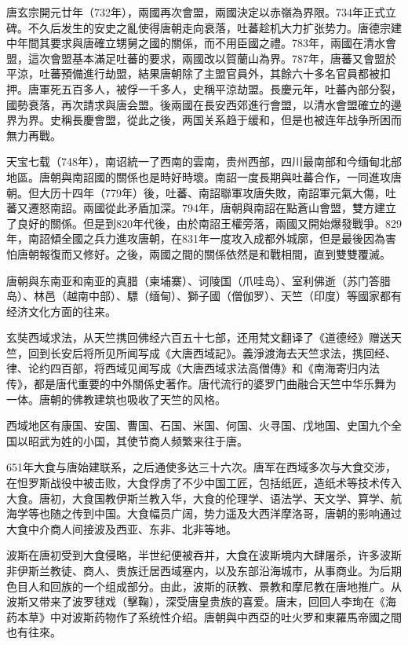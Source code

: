唐玄宗開元廿年（732年），兩國再次會盟，兩國決定以赤嶺為界限。734年正式立碑。不久后发生的安史之亂使得唐朝走向衰落，吐蕃趁机大力扩张势力。唐德宗建中年間其要求與唐確立甥舅之國的關係，而不用臣國之禮。783年，兩國在清水會盟，這次會盟基本滿足吐蕃的要求，兩國改以賀蘭山為界。787年，唐蕃又會盟於平涼，吐蕃預備進行劫盟，結果唐朝除了主盟官員外，其餘六十多名官員都被扣押。唐軍死五百多人，被俘一千多人，史稱平涼劫盟。長慶元年，吐蕃內部分裂，國勢衰落，再次請求與唐会盟。後兩國在長安西郊進行會盟，以清水會盟確立的邊界为界。史稱長慶會盟，從此之後，两国关系趋于缓和，但是也被连年战争所困而無力再戰。

天宝七载（748年），南诏統一了西南的雲南，贵州西部，四川最南部和今缅甸北部地區。唐朝與南詔國的關係也是時好時壞。南詔一度長期與吐蕃合作，一同進攻唐朝。但大历十四年（779年）後，吐蕃、南詔聯軍攻唐失敗，南詔軍元氣大傷，吐蕃又遷怒南詔。兩國從此矛盾加深。794年，唐朝與南詔在點蒼山會盟，雙方建立了良好的關係。但是到820年代後，由於南詔王權旁落，兩國又開始爆發戰爭。829年，南詔傾全國之兵力進攻唐朝，在831年一度攻入成都外城廓，但是最後因為害怕唐朝報復而又修好。之後，兩國之間的關係依然是和戰相間，直到雙雙覆滅。

唐朝與东南亚和南亚的真腊（柬埔寨）、诃陵国（爪哇岛）、室利佛逝（苏门答腊岛）、林邑（越南中部）、驃（缅甸）、獅子國（僧伽罗）、天竺（印度）等國家都有经济文化方面的往来。

玄奘西域求法，从天竺携回佛经六百五十七部，还用梵文翻译了《道德经》赠送天竺，回到长安后将所见所闻写成《大唐西域記》。義淨渡海去天竺求法，携回经、律、论约四百部，将西域见闻写成《大唐西域求法高僧傳》和《南海寄归内法传》，都是唐代重要的中外關係史著作。唐代流行的婆罗门曲融合天竺中华乐舞为一体。唐朝的佛教建筑也吸收了天竺的风格。

西域地区有康国、安国、曹国、石国、米国、何国、火寻国、戊地国、史国九个全国以昭武为姓的小国，其使节商人频繁来往于唐。

651年大食与唐始建联系，之后通使多达三十六次。唐军在西域多次与大食交涉，在怛罗斯战役中被击败，大食俘虏了不少中国工匠，包括纸匠，造纸术等技术传入大食。唐初，大食国教伊斯兰教入华，大食的伦理学、语法学、天文学、算学、航海学等也随之传到中国。大食幅员广阔，势力遥及大西洋摩洛哥，唐朝的影响通过大食中介商人间接波及西亚、东非、北非等地。

波斯在唐初受到大食侵略，半世纪便被吞并，大食在波斯境内大肆屠杀，许多波斯非伊斯兰教徒、商人、贵族迁居西域塞内，以及东部沿海城市，从事商业。为后期色目人和回族的一个组成部分。由此，波斯的祆教、景教和摩尼教在唐地推广。从波斯又带来了波罗毬戏（擊鞠），深受唐皇贵族的喜爱。唐末，回回人李珣在《海药本草》中对波斯药物作了系统性介绍。唐朝與中西亞的吐火罗和東羅馬帝國之間也有往來。


